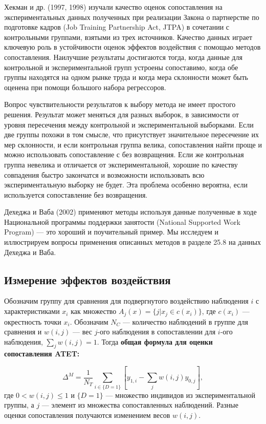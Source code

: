 Хекман и др. (1997, 1998) изучали качество оценок сопоставления на экспериментальных данных  полученных при реализации Закона о партнерстве по подготовке кадров (Job Training Partnership Act, JTPA) в сочетании с контрольными группами, взятыми из трех источников. Качество данных играет ключевую роль в устойчивости оценок эффектов воздействия с помощью методов сопоставления. Наилучшие результаты достигаются тогда, когда данные для контрольной и экспериментальной групп устроены сопоставимо, когда обе группы находятся на одном рынке труда и когда мера склонности может быть оценена при помощи большого набора регрессоров. 

Вопрос чувствительности результатов к выбору метода не имеет простого решения. Результат может меняться для разных выборок, в зависимости от уровня пересечения между контрольной и экспериментальной выборками. Если две группы похожи в том смысле, что присутствует значительное пересечение их мер склонности, и если контрольная группа велика, сопоставления найти проще и можно использовать сопоставление с без возвращения. Если же контрольная группа невелика и отличается от экспериментальной, хорошие по качеству совпадения быстро закончатся и возможности использовать всю экспериментальную выборку не будет. Эта проблема особенно вероятна,  если используется сопоставление без возвращения. 

Дехеджа и Ваба (2002) применяют методы используя данные полученные в ходе Национальной программы поддержки занятости (National Supported Work Program) --- это хороший и поучительный пример. Мы исследуем и иллюстрируем вопросы применения описанных методов в разделе 25.8 на данных Дехеджа и Ваба. 

\subsection{Измерение эффектов воздействия}

Обозначим группу для сравнения для подвергнутого воздействию наблюдения $i$ с характеристиками $x_i$ как множество $A_j (x) = \{ j | x_j \in c(x_i) \}$, где $c(x_i)$ --- окрестность точки $x_i$. Обозначим $N_C$ --- количество наблюдений в группе для сравнения и $w(i, j)$ --- вес $j$-ого наблюдения в сопоставлении для $i$-ого наблюдения, $\sum_j w(i, j) = 1$. Тогда \bfseries  общая формула \mdseries для оценки сопоставления ATET:

\begin{equation}
\label{eq25.40}
\Delta^M = \frac{1}{N_T} \sum_{i \in \{ D=1 \}} [y_{1,i} - \sum_j w(i,j) y_{0,j}],
\end{equation}
где $0 < w(i,j) \le 1$ и $\{ D =1 \}$ --- множество индивидов из экспериментальной группы, а $j$ --- элемент из множества сопоставленных наблюдений. Разные оценки сопоставления получаются изменением весов $w(i,j)$. 

